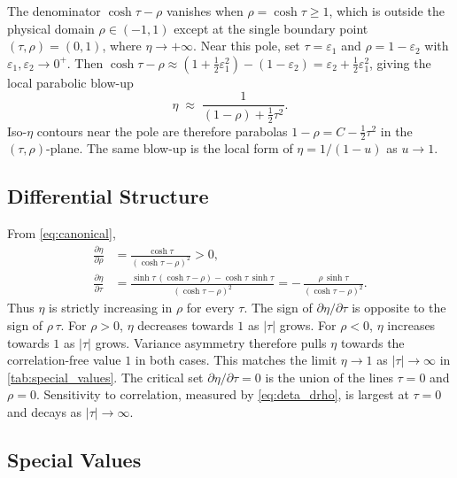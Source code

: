 The denominator $\cosh\tau - \rho$ vanishes when $\rho = \cosh\tau \ge 1$, which is outside the physical domain $\rho \in (-1,1)$ except at the single boundary point $(\tau,\rho) = (0,1)$, where $\eta \to +\infty$.  Near this pole, set $\tau = \varepsilon_1$ and $\rho = 1 - \varepsilon_2$ with $\varepsilon_1, \varepsilon_2 \to 0^+$.  Then $\cosh\tau - \rho \approx (1 + \tfrac{1}{2}\varepsilon_1^2) - (1-\varepsilon_2) = \varepsilon_2 + \tfrac{1}{2}\varepsilon_1^2$, giving the local parabolic blow-up
\begin{equation}
  \eta \;\approx\; \frac{1}{(1-\rho) + \tfrac{1}{2}\tau^{2}}.
  \label{eq:parabolic_blowup}
\end{equation}
Iso-$\eta$ contours near the pole are therefore parabolas $1-\rho = C - \tfrac{1}{2}\tau^{2}$ in the $(\tau,\rho)$-plane.
The same blow-up is the local form of $\eta = 1/(1-u)$ as $u\to 1$.

\subsection{Differential Structure}

From \cref{eq:canonical},
\begin{align}
  \frac{\partial\eta}{\partial\rho}
  &= \frac{\cosh\tau}{(\cosh\tau-\rho)^{2}} > 0,
  \label{eq:deta_drho}\\[4pt]
  \frac{\partial\eta}{\partial\tau}
  &= \frac{\sinh\tau\,(\cosh\tau-\rho) - \cosh\tau\,\sinh\tau}{(\cosh\tau-\rho)^{2}}
   = -\,\frac{\rho\,\sinh\tau}{(\cosh\tau-\rho)^{2}}.
  \label{eq:deta_dtau}
\end{align}
Thus $\eta$ is strictly increasing in $\rho$ for every $\tau$.
The sign of $\partial\eta/\partial\tau$ is opposite to the sign of $\rho\,\tau$.
For $\rho>0$, $\eta$ decreases towards $1$ as $|\tau|$ grows.
For $\rho<0$, $\eta$ increases towards $1$ as $|\tau|$ grows.
Variance asymmetry therefore pulls $\eta$ towards the correlation-free value $1$ in both cases.
This matches the limit $\eta\to 1$ as $|\tau|\to\infty$ in \cref{tab:special_values}.
The critical set $\partial\eta/\partial\tau = 0$ is the union of the lines $\tau = 0$ and $\rho = 0$.
Sensitivity to correlation, measured by \cref{eq:deta_drho}, is largest at $\tau = 0$ and decays as $|\tau|\to\infty$.

\subsection{Special Values}
\label{sec:special_values}

